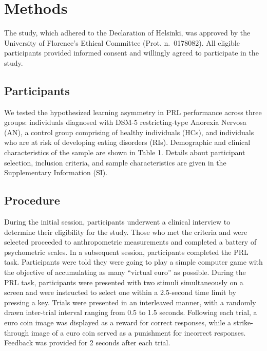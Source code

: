 \documentclass[
  man,floatsintext]{apa6}
\begin{document}
\hypertarget{methods}{%
\section{Methods}\label{methods}}

The study, which adhered to the Declaration of Helsinki, was approved by the University of Florence's Ethical Committee (Prot. n.~0178082). All eligible participants provided informed consent and willingly agreed to participate in the study.

\hypertarget{participants}{%
\subsection{Participants}\label{participants}}

We tested the hypothesized learning asymmetry in PRL performance across three groups: individuals diagnosed with DSM-5 restricting-type Anorexia Nervosa (AN), a control group comprising of healthy individuals (HCs), and individuals who are at risk of developing eating disorders (RIs). Demographic and clinical characteristics of the sample are shown in Table 1. Details about participant selection, inclusion criteria, and sample characteristics are given in the Supplementary Information (SI).

\hypertarget{procedure}{%
\subsection{Procedure}\label{procedure}}

During the initial session, participants underwent a clinical interview to determine their eligibility for the study. Those who met the criteria and were selected proceeded to anthropometric measurements and completed a battery of psychometric scales. In a subsequent session, participants completed the PRL task. Participants were told they were going to play a simple computer game with the objective of accumulating as many ``virtual euro'' as possible. During the PRL task, participants were presented with two stimuli simultaneously on a screen and were instructed to select one within a 2.5-second time limit by pressing a key. Trials were presented in an interleaved manner, with a randomly drawn inter-trial interval ranging from 0.5 to 1.5 seconds. Following each trial, a euro coin image was displayed as a reward for correct responses, while a strike-through image of a euro coin served as a punishment for incorrect responses. Feedback was provided for 2 seconds after each trial.
\end{document}
